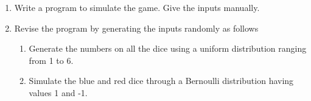 \begin{enumerate}[label=\thesection.\arabic*, ref=\thesection.\theenumi,resume*]
	\item Write a program to simulate the game.  Give the inputs manually.
	\\
	\solution 
	
	\item Revise the program by generating the inputs randomly as follows 
		\begin{enumerate}
			\item Generate the numbers on all the dice using a uniform distribution ranging from 1 to 6.
			\item Simulate the blue and red dice through a Bernoulli distribution having values 1 and -1.
		\end{enumerate}
\end{enumerate}
